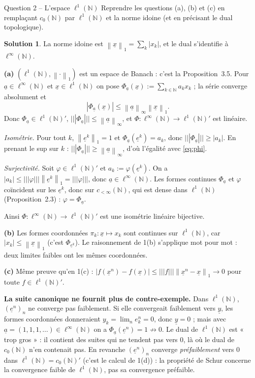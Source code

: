 \documentclass[11pt,a4paper]{article}
\newcommand{\N}{\mathbb{N}}
\newcommand{\norm}[1]{\left\|#1\right\|}
\newcommand{\opnorm}[1]{|\!|\!|#1|\!|\!|}
\theoremstyle{definition}
\newtheorem*{solution}{Solution}
\newcommand{\su}[1]{\underline{#1}}
\newcommand{\linf}{\ell^\infty(\N)}
\newcommand{\lun}{\ell^1(\N)}
\newcommand{\cz}{c_0(\N)}
\begin{document}
\begin{exo}{Question 2 -- L'espace $\ell^1(\N)$}
Reprendre les questions (a), (b) et (c) en remplaçant $\cz$ par $\lun$ et la norme idoine (et en précisant le dual topologique).
\end{exo}

\begin{solution}
La norme idoine est $\norm{\su x}_1=\sum_k|x_k|$, et le dual s'identifie à $\linf$.

\medskip
\noindent\textbf{(a)} $(\lun,\norm\cdot_1)$ est un espace de Banach : c'est la Proposition~3.5. Pour $\su a\in\linf$ et $\su x\in\lun$ on pose $\Phi_{\su a}(\su x):=\sum_{k\in\N}a_kx_k$ ; la série converge absolument et
\begin{equation}\label{eq:phi}
  |\Phi_{\su a}(\su x)|\le\norm{\su a}_\infty\norm{\su x}_1 .
\end{equation}
Donc $\Phi_{\su a}\in\lun'$, $\opnorm{\Phi_{\su a}}\le\norm{\su a}_\infty$, et $\Phi:\linf\to\lun'$ est linéaire.

\emph{Isométrie.} Pour tout $k$, $\norm{\su e^k}_1=1$ et $\Phi_{\su a}(\su e^k)=a_k$, donc $\opnorm{\Phi_{\su a}}\ge|a_k|$. En prenant le sup sur $k$ : $\opnorm{\Phi_{\su a}}\ge\norm{\su a}_\infty$, d'où l'égalité avec \eqref{eq:phi}.

\emph{Surjectivité.} Soit $\varphi\in\lun'$ et $a_k:=\varphi(\su e^k)$. On a $|a_k|\le\opnorm\varphi\norm{\su e^k}_1=\opnorm\varphi$, donc $\su a\in\linf$. Les formes continues $\Phi_{\su a}$ et $\varphi$ coïncident sur les $\su e^k$, donc sur $c_{<\infty}(\N)$, qui est dense dans $\lun$ (Proposition~2.3) : $\varphi=\Phi_{\su a}$.

Ainsi $\Phi:\linf\to\lun'$ est une isométrie linéaire bijective.

\medskip
\noindent\textbf{(b)} Les formes coordonnées $\pi_k:\su x\mapsto x_k$ sont continues sur $\lun$, car $|x_k|\le\norm{\su x}_1$ (c'est $\Phi_{\su e^k}$). Le raisonnement de 1(b) s'applique mot pour mot : deux limites faibles ont les mêmes coordonnées.

\medskip
\noindent\textbf{(c)} Même preuve qu'en 1(c) : $|f(\su x^n)-f(\su x)|\le\opnorm f\norm{\su x^n-\su x}_1\to0$ pour toute $f\in\lun'$.
\end{solution}

\begin{piege}
\textbf{La suite canonique ne fournit plus de contre-exemple.} Dans $\lun$, $(\su e^n)_n$ ne converge pas faiblement. Si elle convergeait faiblement vers $\su y$, les formes coordonnées donneraient $y_k=\lim_ne^n_k=0$, donc $\su y=0$ ; mais avec $\su a=(1,1,1,\dots)\in\linf$ on a $\Phi_{\su a}(\su e^n)=1\not\to0$. Le dual de $\lun$ est « trop gros » : il contient des suites qui ne tendent pas vers $0$, là où le dual de $\cz$ n'en contenait pas. En revanche $(\su e^n)_n$ converge \emph{préfaiblement} vers $0$ dans $\lun=\cz'$ (c'est le calcul de 1(d)) : la propriété de Schur concerne la convergence faible de $\lun$, pas sa convergence préfaible.
\end{piege}
\end{document}
